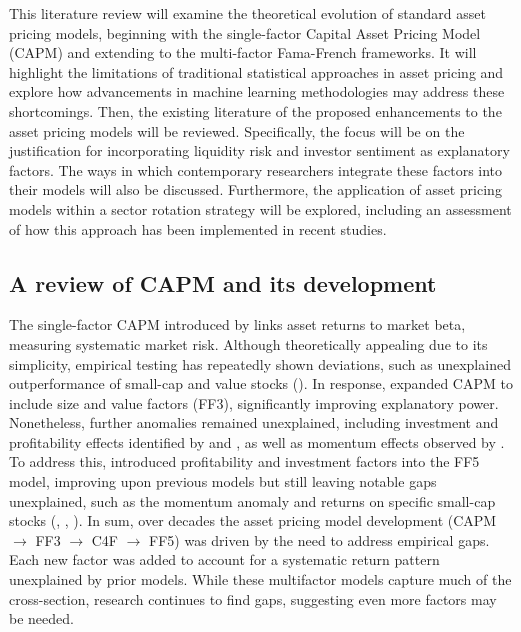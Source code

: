 This literature review will examine the theoretical evolution of standard asset pricing models, beginning with the single-factor Capital Asset Pricing Model (CAPM) and extending to the multi-factor Fama-French frameworks. It will highlight the limitations of traditional statistical approaches in asset pricing and explore how advancements in machine learning methodologies may address these shortcomings. Then, the existing literature of the proposed enhancements to the asset pricing models will be reviewed. Specifically, the focus will be on the justification for incorporating liquidity risk and investor sentiment as explanatory factors. The ways in which contemporary researchers integrate these factors into their models will also be discussed. Furthermore, the application of asset pricing models within a sector rotation strategy will be explored, including an assessment of how this approach has been implemented in recent studies.


\subsection{A review of CAPM and its development}

The single-factor CAPM introduced by  links asset returns to market beta, measuring systematic market risk. Although theoretically appealing due to its simplicity, empirical testing has repeatedly shown deviations, such as unexplained outperformance of small-cap and value stocks (\cite{capm_2004}). In response,  expanded CAPM to include size and value factors (FF3), significantly improving explanatory power. Nonetheless, further anomalies remained unexplained, including investment and profitability effects identified by  and , as well as momentum effects observed by . To address this,  introduced profitability and investment factors into the FF5 model, improving upon previous models but still leaving notable gaps unexplained, such as the momentum anomaly and returns on specific small-cap stocks (\cite{sarwarff5}, , ). In sum, over decades the asset pricing model development (CAPM $\rightarrow$ FF3 $\rightarrow$ C4F $\rightarrow$ FF5) was driven by the need to address empirical gaps. Each new factor was added to account for a systematic return pattern unexplained by prior models. While these multifactor models capture much of the cross-section, research continues to find gaps, suggesting even more factors may be needed.


